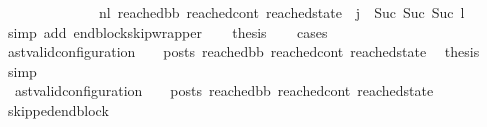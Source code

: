 \begin{isabellebody}
\ \ \ \ \ \ \ \ \ \ \ \ \ \ {\isacharminus}{\kern0pt}n{\isasymlongrightarrow}{\isacharcircum}{\kern0pt}l{}\ {\isacharparenleft}{\kern0pt}reached{\isacharunderscore}{\kern0pt}bb{\isacharcomma}{\kern0pt}\ reached{\isacharunderscore}{\kern0pt}cont{\isacharcomma}{\kern0pt}\ reached{\isacharunderscore}{\kern0pt}state{\isacharparenright}{\kern0pt}{\isacharparenright}{\kern0pt}\ {\isasymand}\ {\isacharparenleft}{\kern0pt}j{\isacharprime}{\kern0pt}\ {\isacharequal}{\kern0pt}\ Suc\ {\isacharparenleft}{\kern0pt}Suc\ {\isacharparenleft}{\kern0pt}Suc\ l{}{\isacharparenright}{\kern0pt}{\isacharparenright}{\kern0pt}{\isacharparenright}{\kern0pt}\ {\isacharparenright}{\kern0pt}{\isachardoublequoteclose}\isanewline
\ \ \ \ \isamarkupfalse%
\ {\isacharparenleft}{\kern0pt}simp\ add{\isacharcolon}{\kern0pt}\ endblock{\isacharunderscore}{\kern0pt}skip{\isacharunderscore}{\kern0pt}wrapper{\isacharparenright}{\kern0pt}\isanewline
\ \ \isamarkupfalse%
\ {\isacharquery}{\kern0pt}thesis\isanewline
\ \ \isamarkupfalse%
\ cases\isanewline
\ \ \ \ \isamarkupfalse%
\ {\isachardoublequoteopen}{\isacharparenleft}{\kern0pt}ast{\isacharunderscore}{\kern0pt}valid{\isacharunderscore}{\kern0pt}configuration\ {\isasymLambda}\ {\isasymGamma}\ {\isasymOmega}\ posts\ reached{\isacharunderscore}{\kern0pt}bb\ reached{\isacharunderscore}{\kern0pt}cont\ reached{\isacharunderscore}{\kern0pt}state{\isacharparenright}{\kern0pt}{\isachardoublequoteclose}\ \isamarkupfalse%
\ {\isacharquery}{\kern0pt}thesis\ \isamarkupfalse%
\ simp\isanewline
\ \ \isamarkupfalse%
\ \isanewline
\ \ \ \ \isamarkupfalse%
\ {\isachardoublequoteopen}{\isasymnot}\ {\isacharparenleft}{\kern0pt}{\isacharparenleft}{\kern0pt}ast{\isacharunderscore}{\kern0pt}valid{\isacharunderscore}{\kern0pt}configuration\ {\isasymLambda}\ {\isasymGamma}\ {\isasymOmega}\ posts\ reached{\isacharunderscore}{\kern0pt}bb\ reached{\isacharunderscore}{\kern0pt}cont\ reached{\isacharunderscore}{\kern0pt}state{\isacharparenright}{\kern0pt}{\isacharparenright}{\kern0pt}{\isachardoublequoteclose}\isanewline
\ \ \ \ \isamarkupfalse%
\ skipped{\isacharunderscore}{\kern0pt}endblock{\isacharcolon}{\kern0pt}\ \isanewline

\end{isabellebody}
